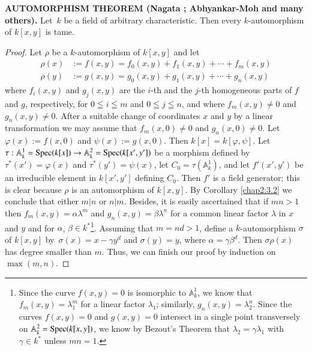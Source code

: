 \subsubsection{}\label{chap2:3.3.1} 
\noindent \textbf{AUTOMORPHISM THEOREM (\cf Nagata \cite{43};
    Abhyankar-Moh \cite{2} and many others).}
  Let\pageoriginale\ $k$ be a field of arbitrary characteristic. Then every
  $k$-automorphism of $k[x,y]$ is tame.


\begin{proof}
Let $\rho$ be a $k$-automorphism of $k[x,y]$ and let 
\begin{align*}
\rho(x) &:= f(x,y)=f_{0}(x,y)+f_{1}(x,y)+\cdots+f_{m}(x,y)\\
\rho(y) &:= g(x,y)=g_{0}(x,y)+g_{1}(x,y)+\cdots+g_{n}(x,y)
\end{align*}
where $f_{i}(x,y)$ and $g_{j}(x,y)$ are the $i$-th and the $j$-th
homogeneous parts of $f$ and $g$, respectively, for $0\leqq i\leqq m$
and $0\leqq j\leqq n$, and where $f_{m}(x,y)\neq 0$ and
$g_{n}(x,y)\neq 0$. After a suitable change of coordinates $x$ and $y$
by a linear transformation we may assume that $f_{m}(x,0)\neq 0$ and
$g_{n}(x,0)\neq 0$. Let $\varphi(x):=f(x,0)$ and
$\psi(x):=g(x,0)$. Then $k[x]=k[\varphi,\psi]$. Let
$\tau:\mathbb{A}^{1}_{k}=\operatorname{Spec}(k[x])\to
\mathbb{A}^{2}_{k}=\operatorname{Spec}(k[x',y'])$ be a morphism defined by
$\tau^{\ast}(x')=\varphi(x)$ and $\tau^{\ast}(y')=\psi(x)$, let
$C_{0}=\tau(\mathbb{A}^{1}_{k})$, and let $f'(x',y')$ be an
irreducible element in $k[x',y']$ defining $C_{0}$. Then $f'$ is a
field generator; this is clear because $\rho$ is an automorphism of
$k[x,y]$. By Corollary \ref{chap2:3.2} we conclude that either $m|n$ or
$n|m$. Besides, it is easily ascertained that if $mn>1$ then
$f_{m}(x,y)=\alpha\lambda^{m}$ and $g_{n}(x,y)=\beta\lambda^{n}$ for a
common linear factor $\lambda$ in $x$ and $y$ and for $\alpha$,
$\beta\in k^{\ast}$\footnote{Since the curve $f(x,y)=0$ is isomorphic
  to $\mathbb{A}^{1}_{k}$, we know that $f_{m}(x,y)=\lambda^{m}_{1}$
  for a linear factor $\lambda_{1}$; similarly,
  $g_{n}(x,y)=\lambda^{n}_{2}$. Since the curves $f(x,y)=0$ and
$g(x,y)=0$ intersect in a single point transversely on
$\mathbb{A}^{2}_{k}=\operatorname{Spec}(k[x,y])$, we know by Bezout's Theorem that
$\lambda_{2}=\gamma\lambda_{1}$ with $\gamma\in k^{\ast}$ unless
  $mn=1$.}. Assuming that $m=nd>1$, define a $k$-automorphism $\sigma$
of $k[x,y]$ by\pageoriginale\ $\sigma(x)=x-\gamma y^{d}$ and
$\sigma(y)=y$, where $\alpha=\gamma\beta^{d}$. Then $\sigma\rho(x)$
has degree smaller than $m$. Thus, we can finish our proof by
induction on $\max(m,n)$.
\end{proof}


